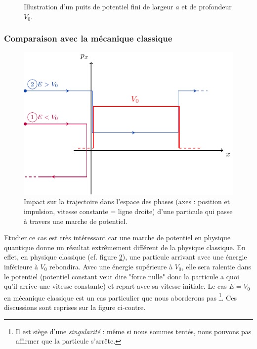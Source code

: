 \documentclass{book}
\begin{document}
\begin{figure}[h]
  \centering
  \caption{Illustration d'un puits de potentiel fini de largeur $a$ et de profondeur $V_0$.}
  \label{fig:chap2-marche_potentiel}
\end{figure}

\subsubsection{Comparaison avec la mécanique classique}
\begin{figure}%
  \centering
  \includegraphics[width=.9\linewidth]{images/marche_potentiel_classique.pdf}
  \caption{Impact sur la trajectoire dans l'espace des phases (axes : position et impulsion, vitesse constante = ligne droite) d'une particule qui passe à travers une marche de potentiel.}
  \label{fig:chap3-marche_potentiel_classique}
  \end{figure}

Etudier ce cas est très intéressant car une marche de potentiel en physique quantique donne un résultat extrêmement différent de la physique classique. En effet, en physique classique (cf. figure \ref{fig:chap3-marche_potentiel_classique}), une particule arrivant avec une énergie inférieure à $V_0$ rebondira. Avec une énergie supérieure à $V_0$, elle sera ralentie dans le potentiel (potentiel constant veut dire "force nulle" donc la particule a quoi qu'il arrive une vitesse constante) et repart avec sa vitesse initiale. Le cas $E=V_0$ en mécanique classique est un cas particulier que nous aborderons pas \footnote{Il est siège d'une \textit{singularité} : même si nous sommes tentés, nous pouvons pas affirmer que la particule s'arrête.}.  Ces discussions sont reprises sur la figure ci-contre. \\
\end{document}
